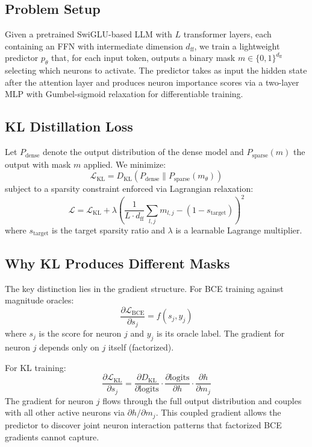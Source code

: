 \documentclass[11pt,a4paper]{article}
\begin{document}
\subsection{Problem Setup}

Given a pretrained SwiGLU-based LLM with $L$ transformer layers, each containing an FFN with intermediate dimension $d_{\text{ff}}$, we train a lightweight predictor $p_\theta$ that, for each input token, outputs a binary mask $m \in \{0,1\}^{d_{\text{ff}}}$ selecting which neurons to activate. The predictor takes as input the hidden state after the attention layer and produces neuron importance scores via a two-layer MLP with Gumbel-sigmoid relaxation for differentiable training.

\subsection{KL Distillation Loss}

Let $P_{\text{dense}}$ denote the output distribution of the dense model and $P_{\text{sparse}}(m)$ the output with mask $m$ applied. We minimize:
\begin{equation}
\mathcal{L}_{\text{KL}} = D_{\text{KL}}(P_{\text{dense}} \| P_{\text{sparse}}(m_\theta))
\end{equation}
subject to a sparsity constraint enforced via Lagrangian relaxation:
\begin{equation}
\mathcal{L} = \mathcal{L}_{\text{KL}} + \lambda \left( \frac{1}{L \cdot d_{\text{ff}}} \sum_{l,j} m_{l,j} - (1 - s_{\text{target}}) \right)^2
\end{equation}
where $s_{\text{target}}$ is the target sparsity ratio and $\lambda$ is a learnable Lagrange multiplier.

\subsection{Why KL Produces Different Masks}
\label{sec:gradient_analysis}

The key distinction lies in the gradient structure. For BCE training against magnitude oracles:
\begin{equation}
\frac{\partial \mathcal{L}_{\text{BCE}}}{\partial s_j} = f(s_j, y_j)
\end{equation}
where $s_j$ is the score for neuron $j$ and $y_j$ is its oracle label. The gradient for neuron $j$ depends only on $j$ itself (factorized).

For KL training:
\begin{equation}
\frac{\partial \mathcal{L}_{\text{KL}}}{\partial s_j} = \frac{\partial D_{\text{KL}}}{\partial \text{logits}} \cdot \frac{\partial \text{logits}}{\partial h} \cdot \frac{\partial h}{\partial m_j}
\end{equation}
The gradient for neuron $j$ flows through the full output distribution and couples with all other active neurons via $\partial h / \partial m_j$. This coupled gradient allows the predictor to discover joint neuron interaction patterns that factorized BCE gradients cannot capture.
\end{document}
